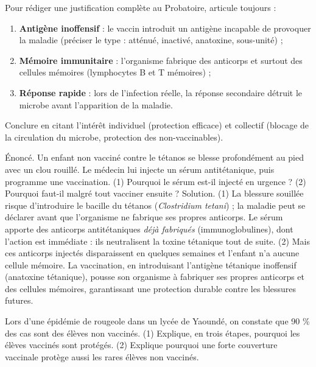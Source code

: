 \documentclass[11pt]{article}
\begin{document}
\begin{methode}
Pour rédiger une justification complète au Probatoire, articule toujours :
\begin{enumerate}
\item \textbf{Antigène inoffensif} : le vaccin introduit un antigène incapable de provoquer la maladie (préciser le type : atténué, inactivé, anatoxine, sous-unité) ;
\item \textbf{Mémoire immunitaire} : l'organisme fabrique des anticorps et surtout des cellules mémoires (lymphocytes B et T mémoires) ;
\item \textbf{Réponse rapide} : lors de l'infection réelle, la réponse secondaire détruit le microbe avant l'apparition de la maladie.
\end{enumerate}
Conclure en citant l'intérêt individuel (protection efficace) et collectif (blocage de la circulation du microbe, protection des non-vaccinables).
\end{methode}

\begin{exoresolu}
Énoncé. Un enfant non vacciné contre le tétanos se blesse profondément au pied avec un clou rouillé. Le médecin lui injecte un sérum antitétanique, puis programme une vaccination. (1) Pourquoi le sérum est-il injecté en urgence ? (2) Pourquoi faut-il malgré tout vacciner ensuite ?
\tcblower
Solution. (1) La blessure souillée risque d'introduire le bacille du tétanos (\emph{Clostridium tetani}) ; la maladie peut se déclarer avant que l'organisme ne fabrique ses propres anticorps. Le sérum apporte des anticorps antitétaniques \emph{déjà fabriqués} (immunoglobulines), dont l'action est immédiate : ils neutralisent la toxine tétanique tout de suite. (2) Mais ces anticorps injectés disparaissent en quelques semaines et l'enfant n'a aucune cellule mémoire. La vaccination, en introduisant l'antigène tétanique inoffensif (anatoxine tétanique), pousse son organisme à fabriquer ses propres anticorps et des cellules mémoires, garantissant une protection durable contre les blessures futures.
\end{exoresolu}

\begin{exercice}
Lors d'une épidémie de rougeole dans un lycée de Yaoundé, on constate que 90 \% des cas sont des élèves non vaccinés. (1) Explique, en trois étapes, pourquoi les élèves vaccinés sont protégés. (2) Explique pourquoi une forte couverture vaccinale protège aussi les rares élèves non vaccinés.
\end{exercice}
\end{document}
